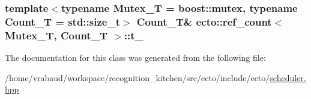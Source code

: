 \subsubsection[{t\+\_\+}]{\setlength{\rightskip}{0pt plus 5cm}template$<$typename Mutex\+\_\+\+T  = boost\+::mutex, typename Count\+\_\+\+T  = std\+::size\+\_\+t$>$ Count\+\_\+\+T\& {\bf ecto\+::ref\+\_\+count}$<$ Mutex\+\_\+\+T, Count\+\_\+\+T $>$\+::t\+\_\+\hspace{0.3cm}{\ttfamily [private]}}\label{classecto_1_1ref__count_a689842816509f8f13710aee79b8c9898}


The documentation for this class was generated from the following file\+:\begin{DoxyCompactItemize}
\item 
/home/vrabaud/workspace/recognition\+\_\+kitchen/src/ecto/include/ecto/\hyperlink{scheduler_8hpp}{scheduler.\+hpp}\end{DoxyCompactItemize}
